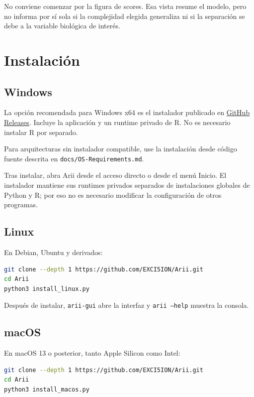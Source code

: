 \documentclass[11pt,a4paper,openany]{report}
\newcommand{\code}[1]{\texttt{#1}}
\begin{document}
No conviene comenzar por la figura de scores. Esa vista resume el modelo, pero
no informa por sí sola si la complejidad elegida generaliza ni si la separación
se debe a la variable biológica de interés.

\chapter{Instalación}

\section{Windows}

La opción recomendada para Windows x64 es el instalador publicado en
\href{https://github.com/EXCI5ION/Arii/releases/latest}{GitHub Releases}. Incluye
la aplicación y un runtime privado de R. No es necesario instalar R por separado.

Para arquitecturas sin instalador compatible, use la instalación desde código
fuente descrita en \code{docs/OS-Requirements.md}.

Tras instalar, abra Arii desde el acceso directo o desde el menú Inicio. El
instalador mantiene sus runtimes privados separados de instalaciones globales
de Python y R; por eso no es necesario modificar la configuración de otros programas.

\section{Linux}

En Debian, Ubuntu y derivados:

\begin{lstlisting}[language=bash]
git clone --depth 1 https://github.com/EXCI5ION/Arii.git
cd Arii
python3 install_linux.py
\end{lstlisting}

Después de instalar, \code{arii-gui} abre la interfaz y \code{arii --help}
muestra la consola.

\section{macOS}

En macOS 13 o posterior, tanto Apple Silicon como Intel:

\begin{lstlisting}[language=bash]
git clone --depth 1 https://github.com/EXCI5ION/Arii.git
cd Arii
python3 install_macos.py
\end{lstlisting}
\end{document}
